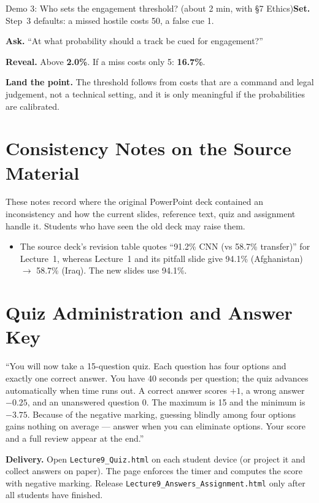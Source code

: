 \documentclass[11pt]{article}
\begin{document}
\begin{live}{Demo 3: Who sets the engagement threshold? (about 2 min, with \S7 Ethics)}\textbf{Set.} Step~3 defaults: a missed hostile costs 50, a false cue 1.\par\smallskip\textbf{Ask.} ``At what probability should a track be cued for engagement?''\par\smallskip\textbf{Reveal.} Above \textbf{2.0\%}. If a miss costs only 5: \textbf{16.7\%}.\par\smallskip\textbf{Land the point.} The threshold follows from costs that are a command and legal judgement, not a technical setting, and it is only meaningful if the probabilities are calibrated.\end{live}

\section{Consistency Notes on the Source Material}These notes record where the original PowerPoint deck contained an inconsistency and how the current slides, reference text, quiz and assignment handle it. Students who have seen the old deck may raise them.\begin{itemize}\item The source deck's revision table quotes ``91.2\% CNN (vs 58.7\% transfer)'' for Lecture~1, whereas Lecture~1 and its pitfall slide give 94.1\% (Afghanistan) $\to$ 58.7\% (Iraq). The new slides use 94.1\%.\end{itemize}

\section{Quiz Administration and Answer Key}

\begin{sayit}``You will now take a 15-question quiz. Each question has four options and exactly one correct answer. You have 40 seconds per question; the quiz advances automatically when time runs out. A correct answer scores $+1$, a wrong answer $-0.25$, and an unanswered question 0. The maximum is 15 and the minimum is $-3.75$. Because of the negative marking, guessing blindly among four options gains nothing on average --- answer when you can eliminate options. Your score and a full review appear at the end.''\end{sayit}

\textbf{Delivery.} Open \texttt{Lecture9\_Quiz.html} on each student device (or project it and collect answers on paper). The page enforces the timer and computes the score with negative marking. Release \texttt{Lecture9\_Answers\_Assignment.html} only after all students have finished.
\end{document}

